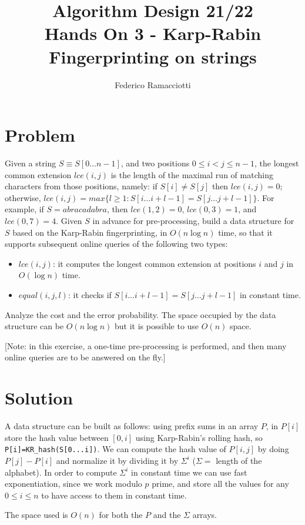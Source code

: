 \documentclass{article}
\title{\LARGE{\textbf{Algorithm Design 21/22}}\\ \vspace{1cm} Hands On 3 - Karp-Rabin Fingerprinting on strings}
\author{Federico Ramacciotti}
\date{}
\begin{document}
\maketitle

\section{Problem}
Given a string $S \equiv S[0\ldots n-1]$, and two positions $0 \leq i<j \leq n-1$, the longest common extension $lce(i, j)$ is the length of the maximal run of matching characters from those positions, namely: if $S[i] \neq S[j]$ then $lce(i, j) = 0$; otherwise, $lce(i, j) = max\{l \geq 1 : S[i\ldots i+l-1] = S[j\ldots j+l-1]\}$. For example, if $S = abracadabra$, then $lce(1, 2)=0$, $lce(0, 3)=1$, and $lce(0, 7)=4$.
Given $S$ in advance for pre-processing, build a data structure for $S$ based on the Karp-Rabin fingerprinting, in $O(n \log n)$ time, so that it supports subsequent online queries of the following two types:
\begin{itemize}
    \item $lce(i,j)$: it computes the longest common extension at positions $i$ and $j$ in $O(\log n)$ time.
    \item $equal(i,j,l)$: it checks if $S[i\ldots i+l-1]=S[j\ldots j+l-1]$ in constant time.
\end{itemize}

Analyze the cost and the error probability. The space occupied by the data structure can be $O(n \log n)$ but it is possible to use $O(n)$ space.

[Note: in this exercise, a one-time pre-processing is performed, and then many online queries are to be answered on the fly.]

\section{Solution}
A data structure can be built as follows: using prefix sums in an array $P$, in $P[i]$ store the hash value between $[0,i]$ using Karp-Rabin's rolling hash, so \texttt{P[i]=KR_hash(S[0...i])}. We can compute the hash value of $P[i,j]$ by doing $P[j]-P[i]$ and normalize it by dividing it by $\Sigma^i$ ($\Sigma=$ length of the alphabet). In order to compute $\Sigma^i$ in constant time we can use fast exponentiation, since we work modulo $p$ prime, and store all the values for any $0\leq i\leq n$ to have access to them in constant time.

The space used is $O(n)$ for both the $P$ and the $\Sigma$ arrays.
\end{document}
